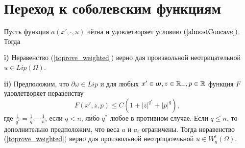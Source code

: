 \section{Переход к соболевским функциям}

\begin{thm}
\label{bounded_growth_thm}
Пусть функция $a(x', \cdot, u)$ чётна и удовлетворяет условию $(\ref{almostConcave})$.
Тогда

\textbf{\textup{i)}} Неравенство (\ref{toprove_weighted}) верно для произвольной неотрицательной $u \in Lip(\Omega)$.

\textbf{\textup{ii)}} Предположим, что $\partial \omega \in Lip$ и
для любых $x' \in \upomega, z \in \mathbb R_+, p \in \mathbb R$
функция $F$ удовлетворяет неравенству
$$F( x', z, p ) \le C ( 1 + |z|^{q^*} + |p|^q ),$$
где $\frac{1}{q^*} = \frac{1}{q} - \frac{1}{n}$, если $q < n$, либо $q^*$ любое в противном случае.
Если $q \le n$, то дополнительно предположим, что веса $a$ и $a_i$ ограничены.
Тогда неравенство (\ref{toprove_weighted}) верно для произвольной неотрицательной $u \in W^1_q(\Omega)$.
\end{thm}

